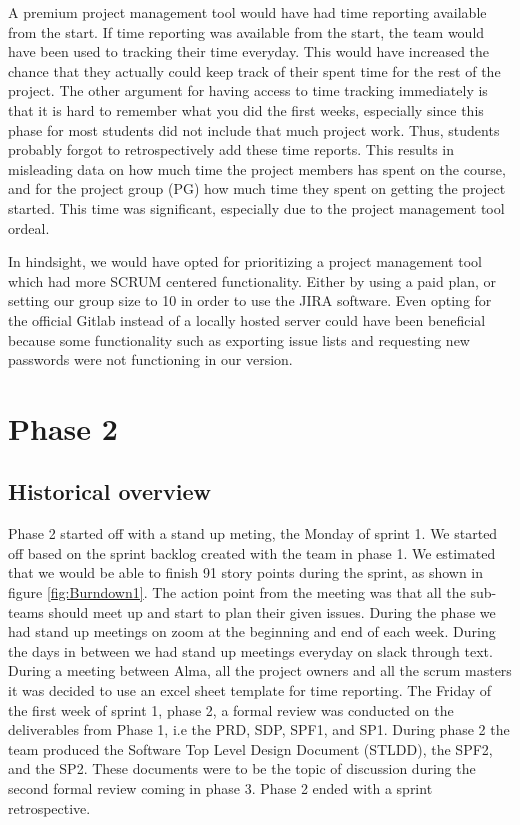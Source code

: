 \documentclass{article}
\begin{document}
A premium project management tool would have had time reporting available from the start. If time reporting was available from the start, the team would have been used to tracking their time everyday. This would have increased the chance that they actually could keep track of their spent time for the rest of the project. The other argument for having access to time tracking immediately is that it is hard to remember what you did the first weeks, especially since this phase for most students did not include that much project work. Thus, students probably forgot to retrospectively add these time reports. This results in misleading data on how much time the project members has spent on the course, and for the project group (PG) how much time they spent on getting the project started. This time was significant, especially due to the project management tool ordeal.  

In hindsight, we would have opted for prioritizing a project management tool which had more SCRUM centered functionality. Either by using a paid plan, or setting our group size to 10 in order to use the JIRA software. Even opting for the official Gitlab instead of a locally hosted server could have been beneficial because some functionality such as exporting issue lists and requesting new passwords were not functioning in our version.

\section{Phase 2} %
\subsection{Historical overview}
Phase 2 started off with a stand up meting, the Monday of sprint 1. We started off based on the sprint backlog created with the team in phase 1. We estimated that we would be able to finish 91 story points during the sprint, as shown in figure \ref{fig:Burndown1}. The action point from the meeting was that all the sub-teams should meet up and start to plan their given issues. During the phase we had stand up meetings on zoom at the beginning and end of each week. During the days in between we had stand up meetings everyday on slack through text. During a meeting between Alma, all the project owners and all the scrum masters it was decided to use an excel sheet template for time reporting. The Friday of the first week of  sprint 1, phase 2, a formal review was conducted on the deliverables from Phase 1, i.e the PRD, SDP, SPF1, and SP1. During phase 2 the team produced the Software Top Level Design Document (STLDD), the SPF2, and the SP2. These documents were to be the topic of discussion during the second formal review coming in phase 3. Phase 2 ended with a sprint retrospective.
\end{document}
